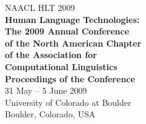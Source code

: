 \documentclass[11pt]{article}
\begin{document}
  \begin{center}
    \LARGE NAACL HLT 2009 \\
  \vspace*{55mm}
    {\bf
    \Huge
    \fontsize{38}{46}\selectfont
    Human Language Technologies: \\
    The 2009 Annual Conference \\
    of the North American Chapter \\
    of the Association for \\
    Computational Linguistics \\
    \vspace{2cm}
    \Huge
    Proceedings of the Conference} \\  %
    \vspace{75mm}
    \LARGE
    31 May -- 5 June 2009 \\
    University of Colorado at Boulder \\
    Boulder, Colorado, USA
  \end{center}
\end{document}
